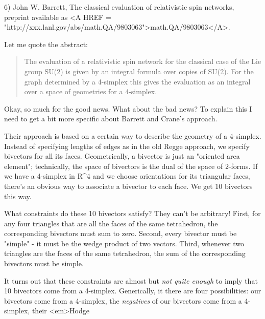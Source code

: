 6) John W. Barrett, The classical evaluation of relativistic spin
networks, preprint available as <A HREF = "http://xxx.lanl.gov/abs/math.QA/9803063">math.QA/9803063</A>.


Let me quote the abstract:

\begin{quote}

     The evaluation of a relativistic spin network for the classical
     case of the Lie group SU(2) is given by an integral formula over
     copies of SU(2).  For the graph determined by a 4-simplex this
     gives the evaluation as an integral over a space of geometries
     for a 4-simplex.

\end{quote}
    

Okay, so much for the good news.  What about the bad news?  To explain
this I need to get a bit more specific about Barrett
and Crane's approach.  

Their approach is based on a certain way to describe the geometry of a
4-simplex.  Instead of specifying lengths of edges as in the old Regge
approach, we specify bivectors for all its faces.  Geometrically, a
bivector is just an "oriented area element"; technically, the space of
bivectors is the dual of the space of 2-forms.  If we have a 4-simplex
in R^{4} and we choose orientations for its triangular faces, there's an
obvious way to associate a bivector to each face.  We get 10 bivectors
this way.

What constraints do these 10 bivectors satisfy?  They can't be
arbitrary!  First, for any four triangles that are all the faces of
the same tetrahedron, the corresponding bivectors must sum to zero.
Second, every bivector must be "simple" - it must be the wedge
product of two vectors.  Third, whenever two triangles are the faces
of the same tetrahedron, the sum of the corresponding bivectors must
be simple.

It turns out that these constraints are almost but \emph{not quite enough}
to imply that 10 bivectors come from a 4-simplex.  Generically, it
there are four possibilities: our bivectors come from a 4-simplex, 
the \emph{negatives} of our bivectors come from a 4-simplex, their <em>Hodge 


